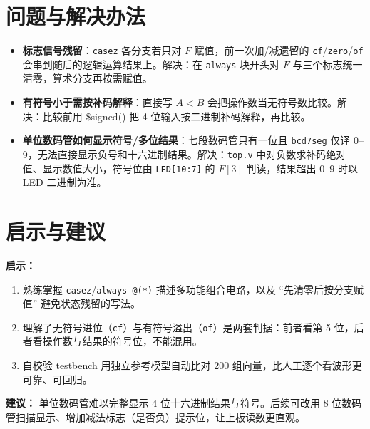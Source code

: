 \documentclass[12pt, a4paper]{ctexart}
\begin{document}
\section{问题与解决办法}
\begin{itemize}
    \item \textbf{标志信号残留}：\texttt{casez} 各分支若只对 $F$ 赋值，前一次加/减遗留的 \texttt{cf}/\texttt{zero}/\texttt{of} 会串到随后的逻辑运算结果上。解决：在 \texttt{always} 块开头对 $F$ 与三个标志统一清零，算术分支再按需赋值。
    \item \textbf{有符号小于需按补码解释}：直接写 $A<B$ 会把操作数当无符号数比较。解决：比较前用 \$signed() 把 4 位输入按二进制补码解释，再比较。
    \item \textbf{单位数码管如何显示符号/多位结果}：七段数码管只有一位且 \texttt{bcd7seg} 仅译 0--9，无法直接显示负号和十六进制结果。解决：\texttt{top.v} 中对负数求补码绝对值、显示数值大小，符号位由 \texttt{LED[10:7]} 的 $F[3]$ 判读，结果超出 0--9 时以 LED 二进制为准。
\end{itemize}

\section{启示与建议}

\textbf{启示：}
\begin{enumerate}
    \item 熟练掌握 \texttt{casez}/\texttt{always @(*)} 描述多功能组合电路，以及 ``先清零后按分支赋值'' 避免状态残留的写法。
    \item 理解了无符号进位（\texttt{cf}）与有符号溢出（\texttt{of}）是两套判据：前者看第 5 位，后者看操作数与结果的符号位，不能混用。
    \item 自校验 testbench 用独立参考模型自动比对 200 组向量，比人工逐个看波形更可靠、可回归。
\end{enumerate}

\textbf{建议：} 单位数码管难以完整显示 4 位十六进制结果与符号。后续可改用 8 位数码管扫描显示、增加减法标志（是否负）提示位，让上板读数更直观。
\end{document}

